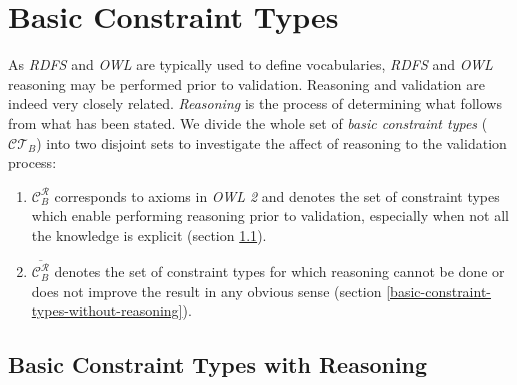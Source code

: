 \documentclass{llncs}
\newcommand{\tb}[1]{\todo[size=\small, color=green!40]{\textbf{Thomas:} #1}}
\begin{document}
{%
%
%

%


\section{Basic Constraint Types}
\label{basic-constraint-types}

As \emph{RDFS} and \emph{OWL} are typically used to define vocabularies, \emph{RDFS} and \emph{OWL} reasoning may be performed prior to validation. 
Reasoning and validation are indeed very closely related. 
\emph{Reasoning} is the process of determining what follows from what has been stated.
We divide the whole set of \emph{basic constraint types} ($\mathcal{CT}_{B}$) into two disjoint sets to investigate the affect of reasoning to the validation process: 
\begin{enumerate}
	\item $\mathcal{C}_B ^{\mathcal{R}}$ corresponds to axioms in \emph{OWL 2} and denotes the set of constraint types which enable performing reasoning prior to validation, especially when not all the knowledge is explicit (section \ref{basic-constraint-types-with-reasoning}).  
  \item $\overline{\mathcal{C}_B ^{\mathcal{R}}}$  denotes the set of constraint types for which reasoning cannot be done or does not improve the result in any obvious sense (section \ref{basic-constraint-types-without-reasoning}).
\end{enumerate}

\subsection{Basic Constraint Types with Reasoning}
\label{basic-constraint-types-with-reasoning}

}
\end{document}
